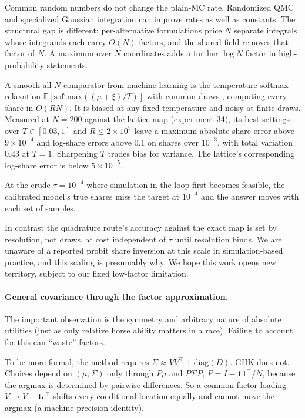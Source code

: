\documentclass[12pt]{article}
\theoremstyle{remark}
\newcommand{\E}{\mathbb{E}}
\begin{document}
Common random numbers do not change the plain-MC rate. Randomized QMC and
specialized Gaussian integration can improve rates as well as
constants. The structural gap is different: per-alternative
formulations price $N$ separate integrals whose integrands each carry
$O(N)$ factors, and the shared field removes that factor of $N$. A
maximum over $N$ coordinates adds a further $\log N$ factor in
high-probability statements.

A smooth all-$N$ comparator from machine learning is the
temperature-softmax relaxation $\E[\mathrm{softmax}((\mu + \xi)/T)]$
with common draws \citep{collier2021,berthet2020}, computing every
share in $O(RN)$. It is biased at any fixed temperature and noisy at
finite draws. Measured at $N = 200$ against the lattice map (experiment
34), its best settings over $T \in [0.03, 1]$ and $R \le 2\times10^5$
leave a maximum absolute share error above $9\times10^{-4}$ and
log-share errors above $0.1$ on shares over $10^{-3}$, with total
variation $0.43$ at $T = 1$. Sharpening $T$ trades bias for variance.
The lattice's corresponding log-share error is below $5\times10^{-5}$.

At the crude $\tau = 10^{-4}$ where simulation-in-the-loop first becomes feasible, the calibrated model's true
shares miss the target at $10^{-4}$ and the answer moves with each set of samples. 

In contrast the quadrature route's accuracy against the exact map is set by
resolution, not draws, at cost independent of $\tau$ until resolution
binds. We are unaware of a reported
probit share inversion at this scale in simulation-based practice, and this
scaling is presumably why. We hope this work opens new territory,
subject to our fixed low-factor limitation. 



\paragraph{General covariance through the factor approximation.} 

The important
observation is the symmetry and arbitrary nature of absolute utilities (just as only relative horse
ability matters in a race). Failing to account for this can ``waste'' factors. 

To be more formal, the method
requires $\Sigma \approx VV^\top + \mathrm{diag}(D)$. GHK does not. Choices depend on
$(\mu, \Sigma)$ only through $P\mu$ and $P\Sigma P$, $P = I -
\mathbf{1}\mathbf{1}^\top/N$, because the argmax is determined by
pairwise differences. So a common factor loading $V \to V +
\mathbf{1}c^\top$ shifts every conditional location equally and cannot move
the argmax (a machine-precision identity). 
\end{document}
